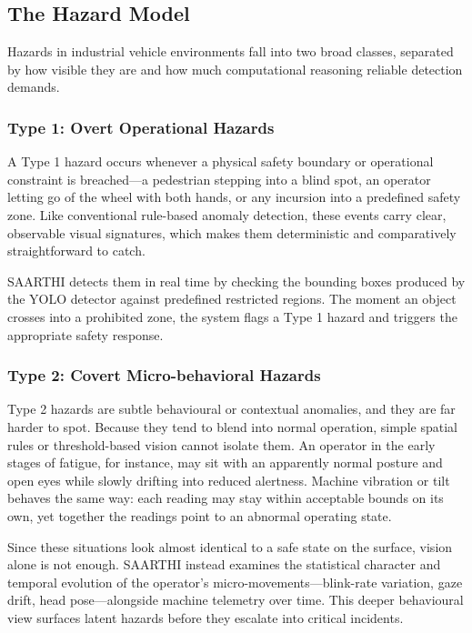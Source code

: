 \subsection{The Hazard Model}
Hazards in industrial vehicle environments fall into two broad classes, separated by how visible they are and how much computational reasoning reliable detection demands.

\subsubsection{Type 1: Overt Operational Hazards}
A Type 1 hazard occurs whenever a physical safety boundary or operational constraint is breached---a pedestrian stepping into a blind spot, an operator letting go of the wheel with both hands, or any incursion into a predefined safety zone. Like conventional rule-based anomaly detection, these events carry clear, observable visual signatures, which makes them deterministic and comparatively straightforward to catch.

SAARTHI detects them in real time by checking the bounding boxes produced by the YOLO detector against predefined restricted regions. The moment an object crosses into a prohibited zone, the system flags a Type 1 hazard and triggers the appropriate safety response.

\subsubsection{Type 2: Covert Micro-behavioral Hazards}
Type 2 hazards are subtle behavioural or contextual anomalies, and they are far harder to spot. Because they tend to blend into normal operation, simple spatial rules or threshold-based vision cannot isolate them. An operator in the early stages of fatigue, for instance, may sit with an apparently normal posture and open eyes while slowly drifting into reduced alertness. Machine vibration or tilt behaves the same way: each reading may stay within acceptable bounds on its own, yet together the readings point to an abnormal operating state.

Since these situations look almost identical to a safe state on the surface, vision alone is not enough. SAARTHI instead examines the statistical character and temporal evolution of the operator's micro-movements---blink-rate variation, gaze drift, head pose---alongside machine telemetry over time. This deeper behavioural view surfaces latent hazards before they escalate into critical incidents.

